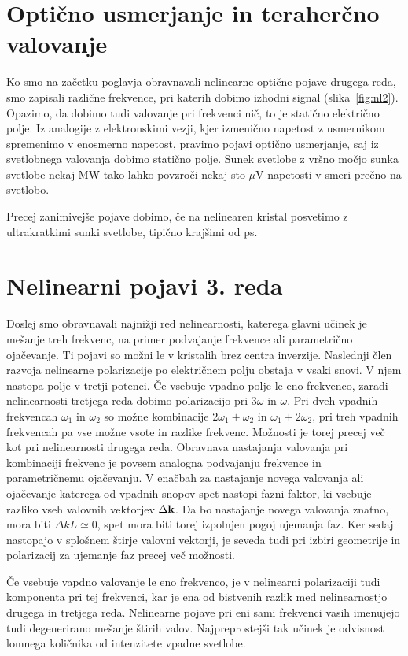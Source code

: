 \section{Optično usmerjanje in teraherčno valovanje}
Ko smo na začetku poglavja obravnavali nelinearne optične pojave drugega reda, smo zapisali
različne frekvence, pri katerih dobimo izhodni signal (slika~\ref{fig:nl2}). Opazimo, 
da dobimo tudi valovanje pri frekvenci nič, to je statično električno polje. Iz analogije
z elektronskimi vezji, kjer izmenično napetost z usmernikom spremenimo v enosmerno napetost, 
pravimo pojavi optično usmerjanje, saj iz svetlobnega valovanja dobimo statično polje.
Sunek svetlobe z vršno močjo sunka svetlobe nekaj MW tako lahko povzroči 
nekaj sto $\mu$V napetosti v smeri prečno na svetlobo. 

Precej zanimivejše pojave dobimo, če na nelinearen kristal posvetimo z ultrakratkimi sunki svetlobe,
tipično krajšimi od ps. 


\section{Nelinearni pojavi 3. reda}

Doslej smo obravnavali najnižji red nelinearnosti, katerega glavni
učinek je mešanje treh frekvenc, na primer podvajanje frekvence ali
parametrično ojačevanje. Ti pojavi so možni le v kristalih brez centra
inverzije. Naslednji člen razvoja nelinearne polarizacije po električnem
polju obstaja v vsaki snovi. V njem nastopa polje v tretji potenci.
Če vsebuje vpadno polje le eno frekvenco, zaradi nelinearnosti tretjega
reda dobimo polarizacijo pri 3$\omega$ in $\omega$. Pri dveh vpadnih
frekvencah $\omega_{1}$ in $\omega_{2}$ so možne kombinacije $2\omega_{1}\pm\omega_{2}$
in $\omega_{1}\pm2\omega_{2}$, pri treh vpadnih frekvencah pa vse
možne vsote in razlike frekvenc. Možnosti je torej precej več kot
pri nelinearnosti drugega reda. Obravnava nastajanja valovanja pri
kombinaciji frekvenc je povsem analogna podvajanju frekvence in parametričnemu
ojačevanju. V enačbah za nastajanje novega valovanja ali ojačevanje
katerega od vpadnih snopov spet nastopi fazni faktor, ki vsebuje razliko
vseh valovnih vektorjev $\Delta{\bf k}$. Da bo nastajanje novega
valovanja znatno, mora biti $\Delta kL\simeq0$, spet mora biti torej
izpolnjen pogoj ujemanja faz. Ker sedaj nastopajo v splošnem štirje
valovni vektorji, je seveda tudi pri izbiri geometrije in polarizacij
za ujemanje faz precej več možnosti.

Če vsebuje vapdno valovanje le eno frekvenco, je v nelinearni polarizaciji
tudi komponenta pri tej frekvenci, kar je ena od bistvenih razlik
med nelinearnostjo drugega in tretjega reda. Nelinearne pojave pri
eni sami frekvenci v\textquotedbl{}asih imenujejo tudi degenerirano
mešanje štirih valov. Najpreprostejši tak učinek je odvisnost lomnega
količnika od intenzitete vpadne svetlobe.

